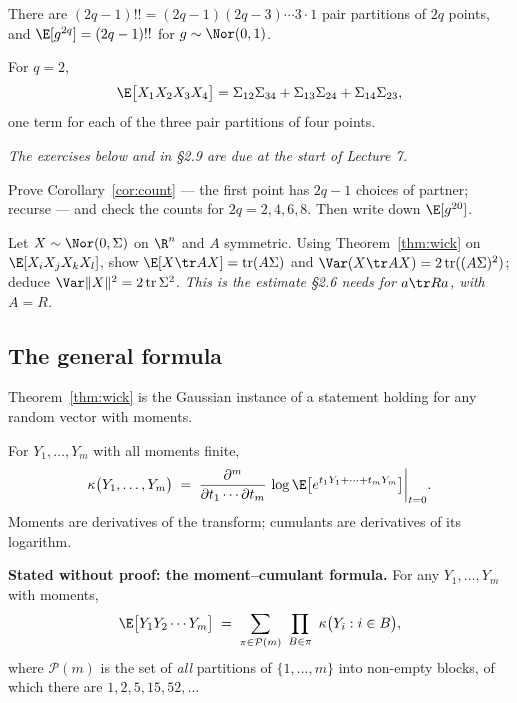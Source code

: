 \documentclass[11pt]{article}
\providecommand{\Tr}{\operatorname{tr}}
\begin{document}
\begin{corollary}\label{cor:count}
There are $(2q-1)!!=(2q-1)(2q-3)\cdots3\cdot1$ pair partitions of $2q$ points, and $\E[g^{2q}]=(2q-1)!!$ for $g\sim\Nor(0,1)$.
\end{corollary}

\begin{example}\label{ex:four}
For $q=2$,
\[
\E\big[X_1X_2X_3X_4\big]=\Sigma_{12}\Sigma_{34}+\Sigma_{13}\Sigma_{24}+\Sigma_{14}\Sigma_{23},
\]
one term for each of the three pair partitions of four points.
\end{example}

\emph{The exercises below and in \S2.9 are due at the start of Lecture 7.}

\begin{exercise}[\ty{A}]
Prove Corollary~\ref{cor:count} --- the first point has $2q-1$ choices of partner; recurse --- and check the counts for $2q=2,4,6,8$. Then write down $\E[g^{20}]$.
\end{exercise}

\begin{exercise}[\ty{B}]
Let $X\sim\Nor(0,\Sigma)$ on $\R^n$ and $A$ symmetric. Using Theorem~\ref{thm:wick} on $\E[X_iX_jX_kX_l]$, show $\E[X\tr AX]=\Tr(A\Sigma)$ and $\Var(X\tr AX)=2\Tr((A\Sigma)^2)$; deduce $\Var\|X\|^2=2\Tr\Sigma^2$. \emph{This is the estimate \S2.6 needs for $a\tr Ra$, with $A=R$.}
\end{exercise}

\subsection{The general formula}

Theorem~\ref{thm:wick} is the Gaussian instance of a statement holding for any random vector with moments.

\begin{definition}\label{def:cum}
For $Y_1,\dots,Y_m$ with all moments finite,
\[
\kappa\big(Y_1,\dots,Y_m\big)\;=\;\frac{\partial^m}{\partial t_1\cdots\partial t_m}\,\log\E\big[e^{t_1Y_1+\cdots+t_mY_m}\big]\bigg|_{t=0}.
\]
Moments are derivatives of the transform; cumulants are derivatives of its logarithm.
\end{definition}

\begin{imported}
\textbf{Stated without proof: the moment--cumulant formula.} For any $Y_1,\dots,Y_m$ with moments,
\[
\E\big[Y_1Y_2\cdots Y_m\big]\;=\;\sum_{\pi\in\mathcal{P}(m)}\ \prod_{B\in\pi}\ \kappa\big(Y_i:i\in B\big),
\]
where $\mathcal{P}(m)$ is the set of \emph{all} partitions of $\{1,\dots,m\}$ into non-empty blocks, of which there are $1,2,5,15,52,\dots$
\end{imported}
\end{document}
